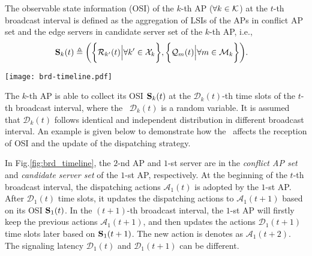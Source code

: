 \begin{definition}
    The observable state information (OSI) of the $k$-th AP ($\forall k\in\mathcal{K}$) at the $t$-th broadcast interval is defined as the aggregation of LSIs of the APs in {conflict AP set} and the edge servers in {candidate server set} of the $k$-th AP, i.e.,
    {\small
    \begin{align}
        \mathbf{S}_{k}(t) &\triangleq
        \bigg(
            \bigg\{\mathcal{R}_{k'}(t) \Big| \forall k'\in\mathcal{X}_{k}\bigg\},
            \bigg\{\mathcal{Q}_{m}(t) \Big| \forall m\in\mathcal{M}_{k}\bigg\}
        \bigg).
    \end{align}
    }%
    \label{def:OSI}
\end{definition}

\begin{figure*}[t]
    \centering
    \texttt{[image: brd-timeline.pdf]}
    \caption{The timeline illustration of reception of OSI for the $1$-st AP where $2$-nd AP is in its \emph{conflict AP set} and $1$-st server is in its \emph{candidate server set}.}
    \label{fig:brd_timeline}
\end{figure*}

The $k$-th AP is able to collect its OSI $\mathbf{S}_{k}(t)$ at the $\mathcal{D}_{k}(t)$-th time slots of the $t$-th broadcast interval, where the \emph{\brlatency}~$\mathcal{D}_{k}(t)$ is a random variable.
It is assumed that $\mathcal{D}_{k}(t)$ follows identical and independent distribution in different broadcast interval.
An example is given below to demonstrate how the \brlatency~affects the reception of OSI and the update of the dispatching strategy.

\begin{example}
    In Fig.\ref{fig:brd_timeline}, the $2$-nd AP and $1$-st server are in the \emph{conflict AP set} and \emph{candidate server set} of the $1$-st AP, respectively.
    At the beginning of the $t$-th broadcast interval, the dispatching actions $\mathcal{A}_{1}(t)$ is adopted by the $1$-st AP.
    After $\mathcal{D}_{1}(t)$ time slots, it updates the dispatching actions to $\mathcal{A}_{1}(t+1)$ based on its OSI $\mathbf{S}_{1}(t)$.
    In the $(t+1)$-th broadcast interval, the $1$-st AP will firstly keep the previous actions $\mathcal{A}_{1}(t+1)$, and then updates the actions $\mathcal{D}_{1}(t+1)$ time slots later based on $\mathbf{S}_{1}(t+1)$. The new action is denotes as $\mathcal{A}_{1}(t+2)$.
    The signaling latency $\mathcal{D}_1(t)$ and $\mathcal{D}_1(t+1)$ can be different.
\end{example}

